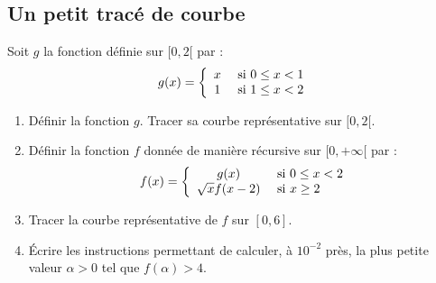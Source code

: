 \documentclass[french,11pt,twoside]{VcCours}
\begin{document}
%
%
%

\subsection{Un petit tracé de courbe}
Soit $g$ la fonction définie sur $[0,2[$ par :
$$ g(x) = \left\lbrace \begin{array}{cl}
x & \hbox{ si } 0 \leq x < 1 \\
1 & \hbox{ si } 1 \leq x < 2 \\
\end{array}\right.$$

\begin{enumerate}
\item Définir la fonction $g$. Tracer sa courbe représentative sur $[0,2[$.
\item Définir la fonction $f$ donnée de manière récursive sur $[0, + \infty[$ par :
$$ f(x) = \left\lbrace \begin{array}{cl}
g(x) & \hbox{ si } 0 \leq x < 2 \\
\sqrt{x}f(x-2) & \hbox{ si } x \geq 2 \\
\end{array}\right.$$
\item Tracer la courbe représentative de $f$ sur $[0,6]$.
\item Écrire les instructions permettant de calculer, à $10^{-2}$ près, la plus petite valeur $\alpha>0$ tel que $f(\alpha)>4$.
\end{enumerate}
\end{document}
